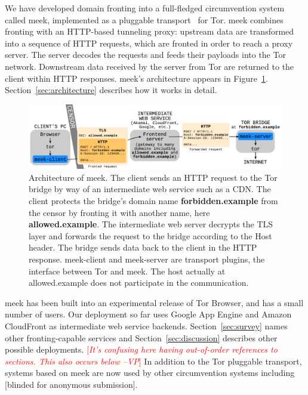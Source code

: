 \documentclass{sig-alternate}
\newcommand{\meekclient}{\mbox{meek-client}\xspace}
\newcommand{\meekserver}{\mbox{meek-server}\xspace}
\newcommand{\meek}{meek\xspace}
\def\urll#1{\begin{NoHyper}\url{#1}\end{NoHyper}}
\newcommand{\note}[1]{{\textcolor{red}{[\textit{#1}]}}}
\newcommand{\vp}[1]{\note{#1 --VP}}
\begin{document}
We have developed domain fronting into a full-fledged circumvention system called \meek,
implemented as a pluggable transport~\cite{pt} for Tor.
\meek combines fronting with an HTTP-based tunneling proxy:
upstream data are transformed into a sequence of HTTP requests,
which are fronted in order to reach a proxy server.
The server decodes the requests and feeds their payloads
into the Tor network.
Downstream data received by the server from Tor
are returned to the client within HTTP responses.
\meek's architecture appears in Figure~\ref{fig:architecture}.
Section~\ref{sec:architecture} describes how it works in detail.

\begin{figure}
\centering
\includegraphics[width=\linewidth]{architecture}
\caption{
Architecture of \meek.
The client sends an HTTP request to the Tor bridge by way of an intermediate web service such as a CDN.
The client protects the bridge's domain name \textbf{forbidden.example} from the censor
by fronting it with another name, here \textbf{allowed.example}.
The intermediate web server decrypts the TLS layer and forwards the request to the bridge
according to the Host header.
The bridge sends data back to the client in the HTTP response.
\meekclient and \meekserver are transport plugins, the interface between Tor and \meek.
The host actually at allowed.example does not participate in the communication.
}
\label{fig:architecture}
\end{figure}

\meek has been built into an experimental release of Tor Browser,
and has a small number of users.
Our deployment so far uses Google App Engine and Amazon CloudFront
as intermediate web service backends.
Section~\ref{sec:survey} names other fronting-capable services
and Section~\ref{sec:discussion} describes other possible deployments.
\vp{It's confusing here having out-of-order references to sections.  This
also occurs below}
In addition to the Tor pluggable transport,
systems based on \meek are now used by other circumvention systems including
[blinded for anonymous submission].
\end{document}
